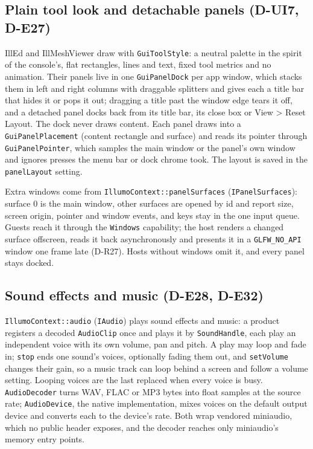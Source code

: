 \subsection{Plain tool look and detachable panels (D-UI7, D-E27)}
IllEd and IllMeshViewer draw with \texttt{GuiToolStyle}: a neutral palette in
the spirit of the console's, flat rectangles, lines and text, fixed tool
metrics and no animation. Their panels live in one \texttt{GuiPanelDock} per
app window, which stacks them in left and right columns with draggable
splitters and gives each a title bar that hides it or pops it out; dragging a
title past the window edge tears it off, and a detached panel docks back from
its title bar, its close box or View \textgreater{} Reset Layout. The dock
never draws content. Each panel draws into a \texttt{GuiPanelPlacement}
(content rectangle and surface) and reads its pointer through
\texttt{GuiPanelPointer}, which samples the main window or the panel's own
window and ignores presses the menu bar or dock chrome took. The layout is
saved in the \texttt{panelLayout} setting.

Extra windows come from \texttt{IllumoContext::panelSurfaces}
(\texttt{IPanelSurfaces}): surface 0 is the main window, other surfaces are
opened by id and report size, screen origin, pointer and window events, and
keys stay in the one input queue. Guests reach it through the
\texttt{Windows} capability; the host renders a changed surface offscreen,
reads it back asynchronously and presents it in a \texttt{GLFW\_NO\_API}
window one frame late (D-R27). Hosts without windows omit it, and every panel
stays docked.

\subsection{Sound effects and music (D-E28, D-E32)}
\texttt{IllumoContext::audio} (\texttt{IAudio}) plays sound effects and music:
a product registers a decoded \texttt{AudioClip} once and plays it by
\texttt{SoundHandle}, each play an independent voice with its own volume, pan
and pitch. A play may loop and fade in; \texttt{stop} ends one sound's voices,
optionally fading them out, and \texttt{setVolume} changes their gain, so a
music track can loop behind a screen and follow a volume setting. Looping
voices are the last replaced when every voice is busy.
\texttt{AudioDecoder} turns WAV, FLAC or MP3 bytes into float
samples at the source rate; \texttt{AudioDevice}, the native implementation,
mixes voices on the default output device and converts each to the device's
rate. Both wrap vendored miniaudio, which no public header exposes, and the
decoder reaches only miniaudio's memory entry points.


